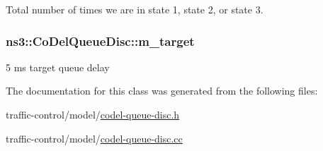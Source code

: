 Total number of times we are in state 1, state 2, or state 3. 

\subsubsection[{\texorpdfstring{m\+\_\+target}{m_target}}]{ ns3\+::\+Co\+Del\+Queue\+Disc\+::m\+\_\+target\hspace{0.3cm}{\ttfamily [private]}}\hypertarget{classns3_1_1CoDelQueueDisc_aa9cb41f0fc76d917b4648ac9da7e9ae3}{}\label{classns3_1_1CoDelQueueDisc_aa9cb41f0fc76d917b4648ac9da7e9ae3}


5 ms target queue delay 



The documentation for this class was generated from the following files\+:\begin{DoxyCompactItemize}
\item 
traffic-\/control/model/\hyperlink{codel-queue-disc_8h}{codel-\/queue-\/disc.\+h}\item 
traffic-\/control/model/\hyperlink{codel-queue-disc_8cc}{codel-\/queue-\/disc.\+cc}\end{DoxyCompactItemize}
